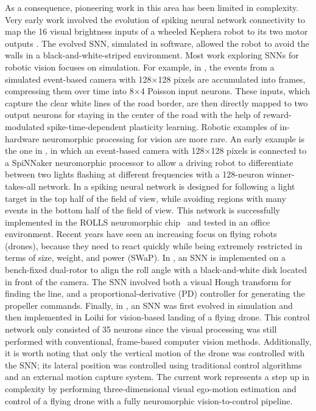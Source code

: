 As a consequence, pioneering work in this area has been limited in complexity. Very early work involved the evolution of spiking neural network connectivity to map the 16 visual brightness inputs of a wheeled Kephera robot to its two motor outputs \cite{floreano2001evolution}. The evolved SNN, simulated in software, allowed the robot to avoid the walls in a black-and-white-striped environment. Most work exploring SNNs for robotic vision focuses on simulation. For example, in \cite{bing2018end}, the events from a simulated event-based camera with 128$\times$128 pixels are accumulated into frames, compressing them over time into 8$\times$4 Poisson input neurons. These inputs, which capture the clear white lines of the road border, are then directly mapped to two output neurons for staying in the center of the road with the help of reward-modulated spike-time-dependent plasticity  learning. Robotic examples of in-hardware neuromorphic processing for vision are more rare. An early example is the one in \cite{galluppi2014eventbased}, in which an event-based camera with 128$\times$128 pixels is connected to a SpiNNaker neuromorphic processor to allow a driving robot to differentiate between two lights flashing at different frequencies with a 128-neuron winner-takes-all network. In \cite{milde2017obstacle} a spiking neural network is designed for following a light target in the top half of the field of view, while avoiding regions with many events in the bottom half of the field of view. This network is successfully implemented in the ROLLS neuromorphic chip~\cite{qiao2015reconfigurable} and tested in an office environment. Recent years have seen an increasing focus on flying robots (drones), because they need to react quickly while being extremely restricted in terms of size, weight, and power (SWaP). In \cite{vitale2021eventdriven}, an SNN is implemented on a bench-fixed dual-rotor to align the roll angle with a black-and-white disk located in front of the camera. The SNN involved both a visual Hough transform \cite{ballard1981generalizing} for finding the line, and a proportional-derivative (PD) controller for generating the propeller commands. Finally, in \cite{dupeyroux2021neuromorphic}, an SNN was first evolved in simulation and then implemented in Loihi for vision-based landing of a flying drone. This control network only consisted of 35 neurons since the visual processing was still performed with conventional, frame-based computer vision methods. Additionally, it is worth noting that only the vertical motion of the drone was controlled with the SNN; its lateral position was controlled using traditional control algorithms and an external motion capture system. The current work represents a step up in complexity by performing three-dimensional visual ego-motion estimation and control of a flying drone with a fully neuromorphic vision-to-control pipeline.

